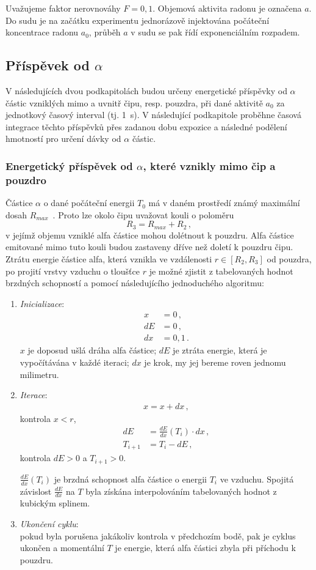\documentclass[11pt,a4paper]{article}
\begin{document}
Uvažujeme faktor nerovnováhy $F=0,1$. Objemová aktivita radonu je označena $a$. Do sudu je na začátku experimentu jednorázově injektována počáteční koncentrace radonu $a_0$, průběh $a$ v sudu se pak řídí exponenciálním rozpadem.
\subsection{Příspěvek od $\alpha$}
V následujících dvou podkapitolách budou určeny energetické příspěvky od $\alpha$ částic vzniklých mimo a uvnitř čipu, resp. pouzdra, při dané aktivitě $a_0$ za jednotkový časový interval (tj. \SI{1}{s}). V následující podkapitole proběhne časová integrace těchto příspěvků přes zadanou dobu expozice a následné podělení hmotností pro určení dávky od $\alpha$ částic.
\subsubsection{Energetický příspěvek od $\alpha$, které vznikly mimo čip a pouzdro}
Částice $\alpha$ o dané počáteční energii $T_0$ má v daném prostředí známý maximální dosah $R_{max}$~\cite{astar}. Proto lze okolo čipu uvažovat kouli o poloměru 
$$R_3=R_{max}+R_2\,,$$
v jejímž objemu vzniklé alfa částice mohou dolétnout k pouzdru. Alfa částice emitované mimo tuto kouli budou zastaveny dříve než doletí k pouzdru čipu. Ztrátu energie částice alfa, která vznikla ve vzdálenosti $r\in[R_2, R_3]$ od pouzdra, po projití vrstvy vzduchu o tloušťce $r$ je možné zjistit z tabelovaných hodnot brzdných schopností \cite{astar} a pomocí následujícího jednoduchého algoritmu:
\begin{enumerate}
	\item \emph{Inicializace}:
	\begin{align*}
	x&=0\,,\\
	  dE&=0\,,\\
	   dx&=0,1\,.
	   \end{align*}
	  $x$ je doposud ušlá dráha alfa částice; $dE$ je ztráta energie, která je vypočítávána v každé iteraci; $dx$ je krok, my jej bereme roven jednomu milimetru.
	\item \emph{Iterace}:
	\begin{align}
		x = x+dx\,,
	\end{align}
	kontrola $x<r$,
	\begin{align*}
	dE &= \frac{dE}{dx}(T_i)\cdot dx\,,\\    
	T_{i+1} &= T_i - dE\,,
	\end{align*}  
	kontrola $dE>0$ a $T_{i+1}>0$. 

$\frac{dE}{dx}(T_i)$ je brzdná schopnost alfa částice o energii $T_i$ ve vzduchu. Spojitá závislost $\frac{dE}{dx}$ na $T$ byla získána interpolováním tabelovaných hodnot z~\cite{astar} kubickým splinem.
\item \emph{Ukončení cyklu}:\\
pokud byla porušena jakákoliv kontrola v předchozím bodě, pak je cyklus ukončen a momentální $T$ je energie, která alfa částici zbyla při příchodu k pouzdru.
\end{enumerate}
\end{document}
